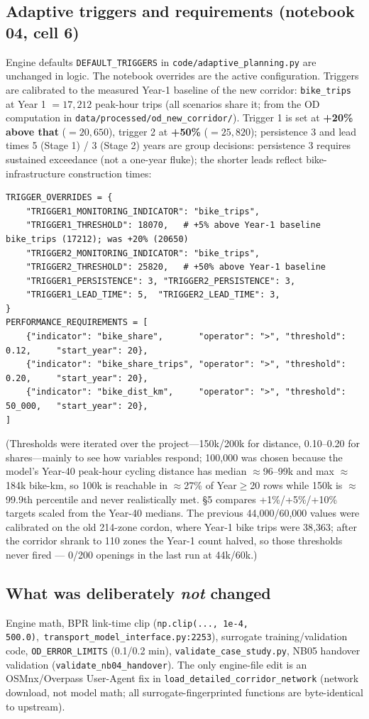 \documentclass[10pt,a4paper]{article}
\begin{document}
\subsection{Adaptive triggers and requirements (notebook 04, cell 6)}
Engine defaults \texttt{DEFAULT\_TRIGGERS} in \texttt{code/adaptive\_planning.py} are
unchanged in logic. The notebook overrides are the active configuration. Triggers are
calibrated to the measured Year-1 baseline of the new corridor:
\texttt{bike\_trips} at Year 1 $= 17{,}212$ peak-hour trips (all scenarios share it; from
the OD computation in \texttt{data/processed/od\_new\_corridor/}). Trigger 1 is set at
\textbf{+20\% above that} ($=20{,}650$), trigger 2 at \textbf{+50\%} ($=25{,}820$);
persistence 3 and lead times 5 (Stage 1) / 3 (Stage 2) years are group decisions:
persistence 3 requires sustained exceedance (not a one-year fluke); the shorter leads
reflect bike-infrastructure construction times:
\begin{lstlisting}
TRIGGER_OVERRIDES = {
    "TRIGGER1_MONITORING_INDICATOR": "bike_trips",
    "TRIGGER1_THRESHOLD": 18070,   # +5% above Year-1 baseline bike_trips (17212); was +20% (20650)
    "TRIGGER2_MONITORING_INDICATOR": "bike_trips",
    "TRIGGER2_THRESHOLD": 25820,   # +50% above Year-1 baseline
    "TRIGGER1_PERSISTENCE": 3, "TRIGGER2_PERSISTENCE": 3,
    "TRIGGER1_LEAD_TIME": 5,  "TRIGGER2_LEAD_TIME": 3,
}
PERFORMANCE_REQUIREMENTS = [
    {"indicator": "bike_share",       "operator": ">", "threshold": 0.12,     "start_year": 20},
    {"indicator": "bike_share_trips", "operator": ">", "threshold": 0.20,     "start_year": 20},
    {"indicator": "bike_dist_km",     "operator": ">", "threshold": 50_000,   "start_year": 20},
]
\end{lstlisting}
(Thresholds were iterated over the project---150k/200k for distance, 0.10--0.20 for
shares---mainly to see how variables respond; 100{,}000 was chosen because the model's
Year-40 peak-hour cycling distance has median $\approx$96--99k and max $\approx$184k
bike-km, so 100k is reachable in $\approx$27\% of Year$\geq$20 rows while 150k is $\approx$99.9th
percentile and never realistically met. \S5 compares +1\%/+5\%/+10\% targets scaled from
the Year-40 medians. The previous 44{,}000/60{,}000 values were calibrated on the old 214-zone cordon, where
Year-1 bike trips were 38{,}363; after the corridor shrank to 110 zones the Year-1 count
halved, so those thresholds never fired --- 0/200 openings in the last run at 44k/60k.)

\subsection{What was deliberately \emph{not} changed}
Engine math, BPR link-time clip (\texttt{np.clip(..., 1e-4, 500.0)},\ \texttt{transport\_model\_interface.py:2253}),
surrogate training/validation code, \texttt{OD\_ERROR\_LIMITS} (0.1/0.2 min),
\texttt{validate\_case\_study.py}, NB05 handover validation
(\texttt{validate\_nb04\_handover}). The only engine-file edit is an OSMnx/Overpass
User-Agent fix in \texttt{load\_detailed\_corridor\_network} (network download, not model
math; all surrogate-fingerprinted functions are byte-identical to upstream).
\end{document}
